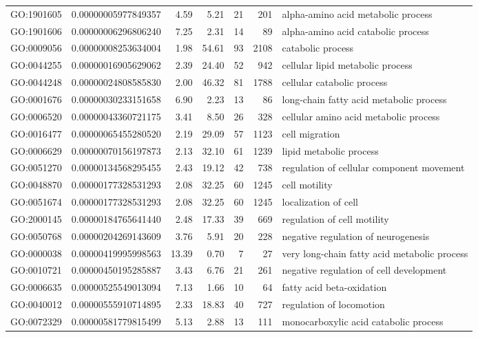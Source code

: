 \documentclass[letterpaper,12pt]{article}
\numberwithin{equation}{appendix}
\begin{document}
\begin{landscape}
{{\begin{longtable}{lrrrrrl}
  GO:1901605 & 0.00000005977849357 & 4.59 & 5.21 & 21 & 201 & alpha-amino acid metabolic process \\ 
  GO:1901606 & 0.00000006296806240 & 7.25 & 2.31 & 14 & 89 & alpha-amino acid catabolic process \\ 
  GO:0009056 & 0.00000008253634004 & 1.98 & 54.61 & 93 & 2108 & catabolic process \\ 
  GO:0044255 & 0.00000016905629062 & 2.39 & 24.40 & 52 & 942 & cellular lipid metabolic process \\ 
  GO:0044248 & 0.00000024808585830 & 2.00 & 46.32 & 81 & 1788 & cellular catabolic process \\ 
  GO:0001676 & 0.00000030233151658 & 6.90 & 2.23 & 13 & 86 & long-chain fatty acid metabolic process \\ 
  GO:0006520 & 0.00000043360721175 & 3.41 & 8.50 & 26 & 328 & cellular amino acid metabolic process \\ 
  GO:0016477 & 0.00000065455280520 & 2.19 & 29.09 & 57 & 1123 & cell migration \\ 
  GO:0006629 & 0.00000070156197873 & 2.13 & 32.10 & 61 & 1239 & lipid metabolic process \\ 
  GO:0051270 & 0.00000134568295455 & 2.43 & 19.12 & 42 & 738 & regulation of cellular component movement \\ 
  GO:0048870 & 0.00000177328531293 & 2.08 & 32.25 & 60 & 1245 & cell motility \\ 
  GO:0051674 & 0.00000177328531293 & 2.08 & 32.25 & 60 & 1245 & localization of cell \\ 
  GO:2000145 & 0.00000184765641440 & 2.48 & 17.33 & 39 & 669 & regulation of cell motility \\ 
  GO:0050768 & 0.00000204269143609 & 3.76 & 5.91 & 20 & 228 & negative regulation of neurogenesis \\ 
  GO:0000038 & 0.00000419995998563 & 13.39 & 0.70 & 7 & 27 & very long-chain fatty acid metabolic process \\ 
  GO:0010721 & 0.00000450195285887 & 3.43 & 6.76 & 21 & 261 & negative regulation of cell development \\ 
  GO:0006635 & 0.00000525549013094 & 7.13 & 1.66 & 10 & 64 & fatty acid beta-oxidation \\ 
  GO:0040012 & 0.00000555910714895 & 2.33 & 18.83 & 40 & 727 & regulation of locomotion \\ 
  GO:0072329 & 0.00000581779815499 & 5.13 & 2.88 & 13 & 111 & monocarboxylic acid catabolic process \\ 

\end{longtable}}}
\end{landscape}
\end{document}
